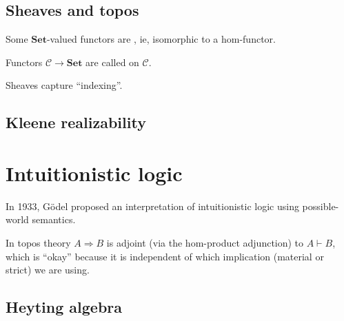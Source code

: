 \subsection{Sheaves and topos}

Some $\mathbf{Set}$-valued functors are , ie, isomorphic to a hom-functor.

Functors $\mathcal{C} \rightarrow \mathbf{Set}$ are called  on $\mathcal{C}$.

Sheaves capture ``indexing''.

\subsection{Kleene realizability}

\section{Intuitionistic logic}

In 1933, G\"{o}del proposed an interpretation of intuitionistic logic using possible-world semantics.

In topos theory $A \Rightarrow B$ is adjoint (via the hom-product adjunction) to $A \vdash B$, which is ``okay'' because it is independent of which implication (material or strict) we are using.

\subsection{Heyting algebra}


